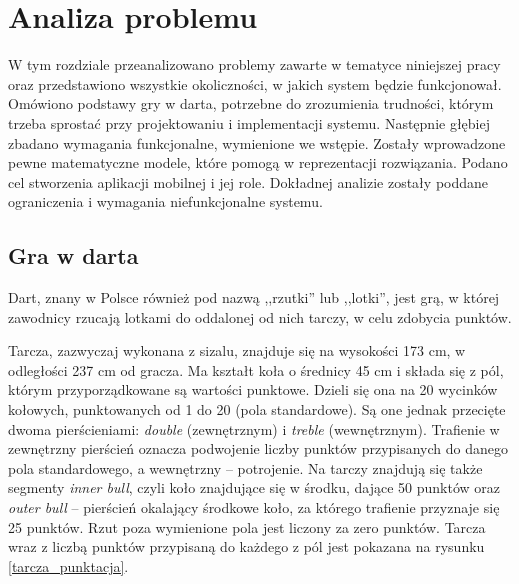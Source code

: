 \chapter{Analiza problemu}
\thispagestyle{chapterBeginStyle}
\label{rozdzial1}

W tym rozdziale przeanalizowano problemy zawarte w tematyce niniejszej pracy oraz przedstawiono wszystkie okoliczności, w jakich system będzie funkcjonował. Omówiono podstawy gry w darta, potrzebne do zrozumienia trudności, którym trzeba sprostać przy projektowaniu i implementacji systemu. Następnie głębiej zbadano wymagania funkcjonalne, wymienione we wstępie. Zostały wprowadzone pewne matematyczne modele, które pomogą w reprezentacji rozwiązania. Podano cel stworzenia aplikacji mobilnej i jej role. Dokładnej analizie zostały poddane ograniczenia i wymagania niefunkcjonalne systemu.

\section{Gra w darta}

Dart, znany w Polsce również pod nazwą ,,rzutki'' lub ,,lotki'', jest grą, w której zawodnicy rzucają lotkami do oddalonej od nich tarczy, w celu zdobycia punktów. 

Tarcza, zazwyczaj wykonana z sizalu, znajduje się na wysokości 173 cm, w odległości 237 cm od gracza. Ma kształt koła o średnicy 45 cm i składa się z pól, którym przyporządkowane są wartości punktowe. Dzieli się ona na 20 wycinków kołowych, punktowanych od 1 do 20 (pola standardowe). Są one jednak przecięte dwoma pierścieniami: \textit{double} (zewnętrznym) i \textit{treble} (wewnętrznym). Trafienie w zewnętrzny pierścień oznacza podwojenie liczby punktów przypisanych do danego pola standardowego, a wewnętrzny -- potrojenie. Na tarczy znajdują się także segmenty \textit{inner bull}, czyli koło znajdujące się w środku, dające 50 punktów oraz \textit{outer bull} -- pierścień okalający środkowe koło, za którego trafienie przyznaje się 25 punktów. Rzut poza wymienione pola jest liczony za zero punktów. Tarcza wraz z liczbą punktów przypisaną do każdego z pól jest pokazana na rysunku \ref{tarcza_punktacja}.

\hspace{1cm}

